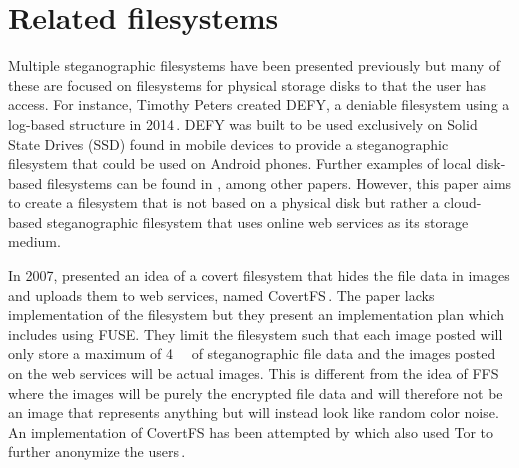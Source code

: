 \section{Related filesystems}
\label{sec:rel_fs}
Multiple steganographic filesystems have been presented previously but many of these are focused on filesystems for physical storage disks to that the user has access. For instance, Timothy Peters created DEFY, a deniable filesystem using a log-based structure in 2014\,\cite{petersDEFYDeniableFile2014}. DEFY was built to be used exclusively on Solid State Drives (\gls{SSD}) found in mobile devices to provide a steganographic filesystem that could be used on Android phones. Further examples of local disk-based filesystems can be found in \cite{andersonSteganographicFileSystem1998, mcdonaldStegFSSteganographicFile2000, domingo-ferrerSharedSteganographicFile2008, hanMultiuserSteganographicFile2010}, among other papers. However, this paper aims to create a filesystem that is not based on a physical disk but rather a cloud-based steganographic filesystem that uses online web services as its storage medium. 

In 2007, \citeauthor{baliga2007web} presented an idea of a covert filesystem that hides the file data in images and uploads them to web services, named CovertFS\,\cite{baliga2007web}. The paper lacks implementation of the filesystem but they present an implementation plan which includes using FUSE. They limit the filesystem such that each image posted will only store a maximum of \SI{4}{\kilo\byte} of steganographic file data and the images posted on the web services will be actual images. This is different from the idea of FFS where the images will be purely the encrypted file data and will therefore not be an image that represents anything but will instead look like random color noise. An implementation of CovertFS has been attempted by \citeauthor{sosaSuperSecretFile2007} which also used Tor to further anonymize the users\,\cite{sosaSuperSecretFile2007}.

